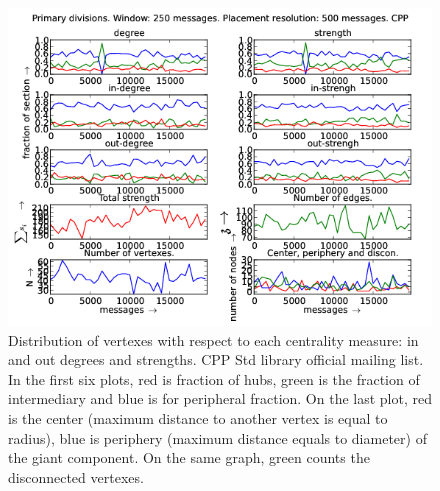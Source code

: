 \documentclass[%
 aip,
 jmp,%
 amsmath,amssymb,
 reprint,%
]{revtex4-1}
\begin{document}
\begin{figure}[hbtp] 
   \centering
        \includegraphics[width=\textwidth]{figs/CPP/250}
    \caption{Distribution of vertexes with respect to each centrality measure: in and out degrees and strengths. CPP Std library official mailing list. In the first six plots, red is fraction of hubs, green is the fraction of intermediary and blue is for peripheral fraction. On the last plot, red is the center (maximum distance to another vertex is equal to radius), blue is periphery (maximum distance equals to diameter) of the giant component. On the same graph, green counts the disconnected vertexes.}
    \label{fig:cpp250}
\end{figure}
\end{document}
